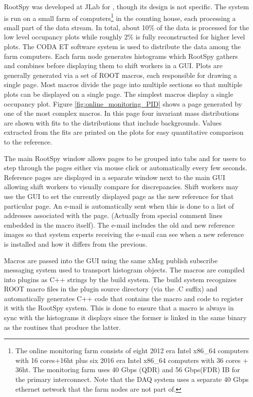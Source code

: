 RootSpy was developed at JLab for \GX, though its design is not \GX specific. The system is run on a small farm of computers\footnote{The online monitoring farm consists of eight 2012 era Intel x86\_64 computers with 16 cores+16ht plus six 2016 era Intel x86\_64 computers with 36 cores + 36ht. The monitoring farm uses 40 Gbps (QDR) and 56 Gbps(FDR) IB for the primary interconnect. Note that the DAQ system uses a separate 40 Gbps ethernet network that the farm nodes are not part of.} in the counting house, each processing a small part of the data stream. In total, about 10\% of the data is processed for the low level occupancy plots while roughly 2\% is fully reconstructed for higher level plots. The CODA ET software system is used to distribute the data among the farm computers. Each farm node generates histograms which RootSpy gathers and combines before displaying them to shift workers in a GUI.
Plots are generally generated via a set of ROOT macros, each responsible for drawing a single page. Most macros divide the page into multiple sections so that multiple plots can be displayed on a single page. The simplest macros display a single occupancy plot. Figure \ref{fig:online_monitoring_PID} shows a page generated by one of the most complex macros. In this page four invariant mass distributions are shown with fits to the distributions that include backgrounds. Values extracted from the fits are printed on the plots for easy quantitative comparison to the reference. 

The main RootSpy window allows pages to be grouped into tabs and for users to step through the pages either via mouse click or automatically every few seconds. Reference pages are displayed in a separate window next to the main GUI allowing shift workers to visually compare for discrepancies. Shift workers may use the GUI to set the currently displayed page as the new reference for that particular page. An e-mail is automatically sent when this is done to a list of addresses associated with the page. (Actually from special comment lines embedded in the macro itself). The e-mail includes the old and new reference images so that system experts receiving the e-mail can see when a new reference is installed and how it differs from the previous.

Macros are passed into the GUI using the same xMsg\cite{xmsg} publish subscribe messaging system used to transport histogram objects. The macros are compiled into plugins as C++ strings by the build system. The build system recognizes ROOT macro files in the plugin source directory (via the .C suffix) and automatically generates C++ code that contains the macro and code to register it with the RootSpy system. This is done to ensure that a macro is always in sync with the histograms it displays since the former is linked in the same binary as the routines that produce the latter.

